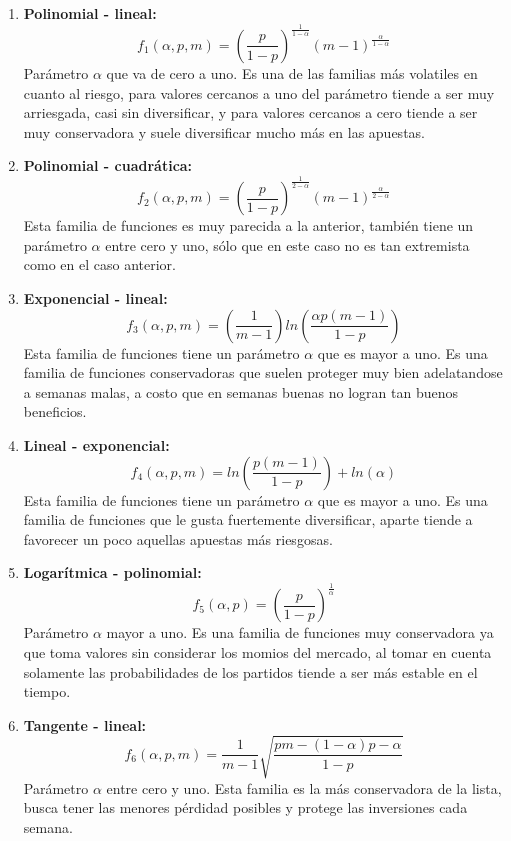 \begin{enumerate}
		\item \textbf{Polinomial - lineal:} 
		\[f_1(\alpha, p, m) = \left(\frac{p}{1-p} \right)^\frac{1}{1-\alpha}(m-1)^\frac{\alpha}{1-\alpha}\]
Parámetro $\alpha$ que va de cero a uno. Es una de las familias más volatiles en cuanto al riesgo, para valores cercanos a uno del parámetro tiende a ser muy arriesgada, casi sin diversificar, y para valores cercanos a cero tiende a ser muy conservadora y suele diversificar mucho más en las apuestas.

		\item \textbf{Polinomial - cuadrática:} 
		\[f_2(\alpha, p, m) = \left(\frac{p}{1-p} \right)^\frac{1}{2-\alpha}(m-1)^\frac{\alpha}{2-\alpha}\]
Esta familia de funciones es muy parecida a la anterior, también tiene un parámetro $\alpha$ entre cero y uno, sólo que en este caso no es tan extremista como en el caso anterior.
		
		\item \textbf{Exponencial - lineal:} 
		\[f_3(\alpha, p, m) = \left(\frac{1}{m-1} \right)ln\left(\frac{\alpha p(m-1)}{1-p}\right)\]
Esta familia de funciones tiene un parámetro $\alpha$ que es mayor a uno. Es una familia de funciones conservadoras que suelen proteger muy bien adelatandose a semanas malas, a costo que en semanas buenas no logran tan buenos beneficios.
		
		\item \textbf{Lineal - exponencial:} 
		\[f_4(\alpha, p, m) = ln\left(\frac{p(m-1)}{1-p}\right) + ln(\alpha)\]
Esta familia de funciones tiene un parámetro $\alpha$ que es mayor a uno. Es una familia de funciones que le gusta fuertemente diversificar, aparte tiende a favorecer un poco aquellas apuestas más riesgosas.

		\item \textbf{Logarítmica - polinomial:} 
		\[f_5(\alpha, p) = \left(\frac{p}{1-p}\right)^\frac{1}{\alpha}\]
Parámetro $\alpha$ mayor a uno. Es una familia de funciones muy conservadora ya que toma valores sin considerar los momios del mercado, al tomar en cuenta solamente las probabilidades de los partidos tiende a ser más estable en el tiempo.

		\item \textbf{Tangente - lineal:} 
		\[f_6(\alpha, p, m) = \frac{1}{m-1}\sqrt{\frac{pm - (1-\alpha)p - \alpha}{1-p}}\]
		Parámetro $\alpha$ entre cero y uno. Esta familia es la más conservadora de la lista, busca tener las menores pérdidad posibles y protege las inversiones cada semana.
\end{enumerate}

